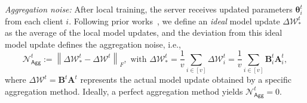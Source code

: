\documentclass{article} %
\newcommand{\Agg}{\mathsf{Agg}}
\begin{document}
\textit{Aggregation noise:} After local training, the server receives updated parameters $\boldsymbol{\theta}^{t}_i$ from each client $i$. Following prior works~\cite{wangflora,sun2024improving}, we define an \textit{ideal} model update $ \Delta \boldsymbol{\mathcal{W}}_*^t$ as the average of the local model updates, and the deviation from this ideal model update defines the aggregation noise, i.e., 
\begin{equation}
  \mathcal{N}_{\Agg}^{t} := \left\| \Delta {\boldsymbol{\mathcal{W}}}_{*}^{t} - \Delta {\boldsymbol{\mathcal{W}}}^{t} \right\|_F, \text{ with } \Delta {\boldsymbol{\mathcal{W}}}_*^{t } =  \frac{1}{v}\sum_{i\in [v]} \Delta {\boldsymbol{\mathcal{W}}_i^t} =  \frac{1}{v}\sum_{i\in [v]} \mathbf{B}_i^{t} \mathbf{A}_i^{t},
\end{equation}
where $\Delta\boldsymbol{\mathcal{W}}^{t}=\mathbf{B}^{t}\mathbf{A}^{t}$ represents the actual model update obtained by a specific aggregation method. Ideally, a perfect aggregation method yields $\mathcal{N}_{\Agg}^{t} = 0$. 
\end{document}
